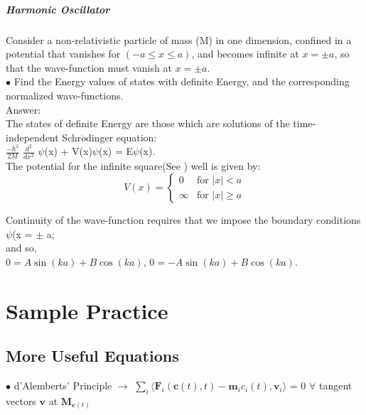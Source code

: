 \documentclass[a4paper, 10pt, onepage]{elegantbook}
\begin{document}
{\paragraph{Harmonic Oscillator}
\label{Harmonic Oscillator}
\noindent

Consider a non-relativistic particle of mass (M) in one dimension, confined in a potential that vanishes for $(-a \leq x \leq a)$, and becomes infinite at $x = \pm a$, so that the wave-function must vanish at $x = \pm a$.  \\

$\bullet$ Find the Energy values of states with definite Energy, and the corresponding normalized wave-functions.  \\

Answer:  \\

The states of definite Energy are those which are solutions of the time-independent Schr$\ddot{o}$dinger equation:  \\

$\frac{-\hbar^2}{2M}$ $\frac{d^2}{dx^2}$ $\psi$(x) + V(x)$\psi$(x) = E$\psi$(x).  \\

The potential for the infinite square(See \pageref{ch:Special Potentials}) well is given by:  \\

\[
V(x) = \begin{cases}
0 & \text{for } |x| < a \\
\infty & \text{for } |x| \geq a
\end{cases}
\]

Continuity of the wave-function requires that we impose the boundary conditions $\psi$(x = $\pm$ a;  \\

and so, \\

\noindent
$0 = A \sin(ka) + B \cos(ka)$, \qquad $0 = -A \sin(ka) + B \cos(ka)$.



\chapter{Sample Practice}

\section{More Useful Equations}

$\bullet$  d'Alemberts' Principle $\longrightarrow$  $\sum_i \langle \mathbf {F}_i(\mathbf c(t),t) - \mathbf {m}_i {c_i(t)}, \mathbf {v}_{i} \rangle$ = 0 $\forall$ tangent vectors $\mathbf v$ at $\mathbf {M}_{\mathbf c(t)}$  \\

}
\end{document}
